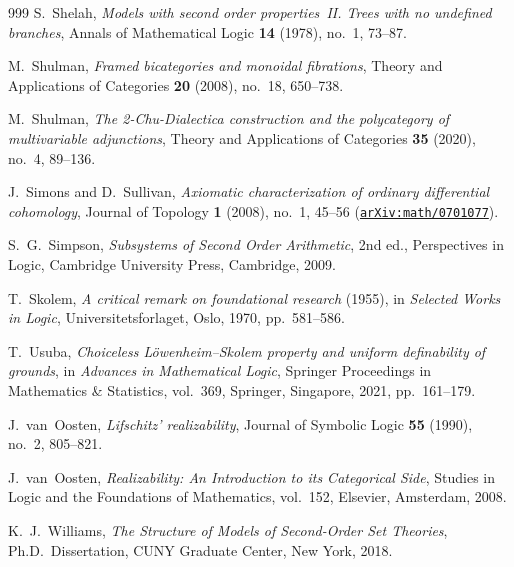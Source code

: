 \begin{thebibliography}{999}
S.~Shelah,
\emph{Models with second order properties~II. Trees with no undefined branches},
Annals of Mathematical Logic \textbf{14} (1978), no.~1, 73--87.

M.~Shulman,
\emph{Framed bicategories and monoidal fibrations},
Theory and Applications of Categories \textbf{20} (2008), no.~18, 650--738.

M.~Shulman,
\emph{The 2-Chu-Dialectica construction and the polycategory of multivariable adjunctions},
Theory and Applications of Categories \textbf{35} (2020), no.~4, 89--136.

J.~Simons and D.~Sullivan,
\emph{Axiomatic characterization of ordinary differential cohomology},
Journal of Topology \textbf{1} (2008), no.~1, 45--56 (\href{https://arxiv.org/abs/math/0701077}{\texttt{arXiv:math/0701077}}).

S.~G.~Simpson,
\emph{Subsystems of Second Order Arithmetic},
2nd ed., Perspectives in Logic, Cambridge University Press, Cambridge, 2009.

T.~Skolem,
\emph{A critical remark on foundational research} (1955),
in \emph{Selected Works in Logic}, Universitetsforlaget, Oslo, 1970, pp.~581--586.

T.~Usuba,
\emph{Choiceless L\"owenheim--Skolem property and uniform definability of grounds},
in \emph{Advances in Mathematical Logic}, Springer Proceedings in Mathematics \& Statistics, vol.~369, Springer, Singapore, 2021, pp.~161--179.

J.~van~Oosten,
\emph{Lifschitz' realizability},
Journal of Symbolic Logic \textbf{55} (1990), no.~2, 805--821.

J.~van~Oosten,
\emph{Realizability: An Introduction to its Categorical Side},
Studies in Logic and the Foundations of Mathematics, vol.~152, Elsevier, Amsterdam, 2008.

K.~J.~Williams,
\emph{The Structure of Models of Second-Order Set Theories},
Ph.D.\ Dissertation, CUNY Graduate Center, New York, 2018.

\end{thebibliography}
